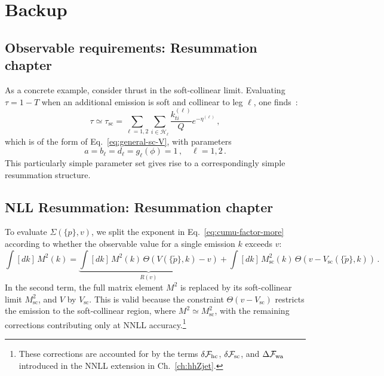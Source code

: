 \chapter{Backup}


\section{Observable requirements: Resummation chapter}
As a concrete example, consider thrust in the soft-collinear limit.
Evaluating $\tau = 1 - T$ when an additional emission is soft and collinear
to leg $\ell$, one finds~\cite{Banfi:2004yd}:
\begin{equation}
	\tau\simeq\tau_\mathrm{sc}=\sum_{\ell=1,2}\sum_{i\in\mathcal{H}_\ell}\frac{k_{ti}^{(\ell)}}{Q}e^{-\eta^{(\ell)}}\,,
\end{equation}
which is of the form of Eq.~\eqref{eq:general-sc-V}, with parameters
\begin{equation}
    a = b_\ell = d_\ell = g_\ell(\phi) = 1\,, \quad \ell = 1, 2\,.
\end{equation}
This particularly simple parameter set gives rise to a correspondingly 
simple resummation structure.

\section{NLL Resummation: Resummation chapter}

To evaluate $\Sigma(\{p\},v)$, we split the exponent in
Eq.~\eqref{eq:cumu-factor-more} according to whether the observable value
for a single emission $k$ exceeds $v$:
\begin{equation}
\label{eq:exp-rad}
  \int[dk]\,M^2(k)
  = \underbrace{\int[dk]\,M^2(k)\,\Theta\!\left(V(\{\tilde{p}\},k)-v\right)}_{\displaystyle R(v)}+ \int[dk]\,M_{\mathrm{sc}}^2(k)\,\Theta\!\left(v-V_{\mathrm{sc}}(\{\tilde{p}\},k)\right)\,.
\end{equation}
In the second term, the full matrix element $M^2$ is replaced by its
soft-collinear limit $M_{\mathrm{sc}}^2$, and $V$ by $V_{\mathrm{sc}}$.
This is valid because the constraint
$\Theta(v-V_{\mathrm{sc}})$ restricts the emission to the
soft-collinear region, where $M^2\simeq M_{\mathrm{sc}}^2$, with the
remaining corrections contributing only at NNLL accuracy.\footnote{These
corrections are accounted for by the terms
$\delta\mathcal{F}_{\rm hc}$, $\delta\mathcal{F}_{\rm sc}$, and
$\Delta\mathcal{F}_{\rm wa}$ introduced in the NNLL extension in
Ch.~\ref{ch:hhZjet}.}

